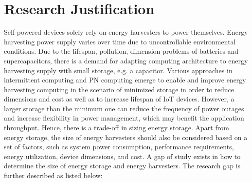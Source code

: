 
\section{Research Justification}


Self-powered devices solely rely on energy harvesters to power themselves. 
Energy harvesting power supply varies over time due to uncontrollable environmental conditions. 
Due to the lifespan, pollution, dimension problems of batteries and supercapacitors, there is a demand for adapting computing architecture to energy harvesting supply with small storage, e.g. a capacitor. 
Various approaches in intermittent computing and PN computing emerge to enable and improve energy harvesting computing in the scenario of minimized storage in order to reduce dimensions and cost as well as to increase lifespan of IoT devices. 
However, a larger storage than the minimum one can reduce the frequency of power outages and increase flexibility in power management, which may benefit the application throughput. 
Hence, there is a trade-off in sizing energy storage. 
Apart from energy storage, the size of energy harvesters should also be considered based on a set of factors, such as system power consumption, performance requirements, energy utilization, device dimensions, and cost. 
A gap of study exists in how to determine the size of energy storage and energy harvesters. The research gap is further described as listed below:

